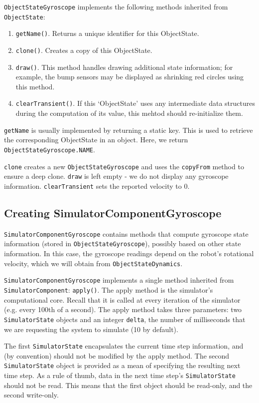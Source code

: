 \documentclass[12pt]{article}
\newcommand{\code}[1]{\texttt{#1}}
\begin{document}
\code{ObjectStateGyroscope} implements the following methods inherited from 
\code{ObjectState}:

\begin{enumerate}
  \item{\code{getName()}. Returns a unique identifier for this ObjectState.}
  \item{\code{clone()}. Creates a copy of this ObjectState.}
  \item{\code{draw()}. This method handles drawing additional state information;
    for example, the bump sensors may be displayed as shrinking red circles
    using this method.}
  \item{\code{clearTransient()}. If this `ObjectState' uses any intermediate
    data structures during the computation of its value, this mehtod should 
    re-initialize them.}
\end{enumerate}

\code{getName} is usually implemented by returning a static key. This is used
to retrieve the corresponding ObjectState in an object.  Here, we return
\code{ObjectStateGyroscope.NAME}.

\code{clone} creates a new \code{ObjectStateGyroscope} and uses the
\code{copyFrom} method to ensure a deep clone.
\code{draw} is left empty - we do not display any gyroscope information.
\code{clearTransient} sets the reported velocity to 0.


\subsection{Creating SimulatorComponentGyroscope}

\code{SimulatorComponentGyroscope} contains methods that compute gyroscope
state information (stored in \code{ObjectStateGyroscope}), possibly based
on other state information. In this case, the gyroscope readings depend on
the robot's rotational velocity, which we will obtain from 
\code{ObjectStateDynamics}.

\code{SimulatorComponentGyroscope} implements a single method inherited from
\code{SimulatorComponent}: \code{apply()}. The apply method is the simulator's
computational core. Recall that it is called at every iteration of the 
simulator (e.g. every 100th of a second). The apply method takes three 
parameters: two \code{SimulatorState} objects and an integer \code{delta},
the number of milliseconds that we are requesting the system to simulate
(10 by default).

The first \code{SimulatorState} encapsulates the current time step information,
and (by convention) should not be modified by the apply method. The second
\code{SimulatorState} object is provided as a mean of specifying the resulting
next time step. As a rule of thumb, data in the next time step's 
\code{SimulatorState} should not be read. This means that the first object
should be read-only, and the second write-only. 
\end{document}
